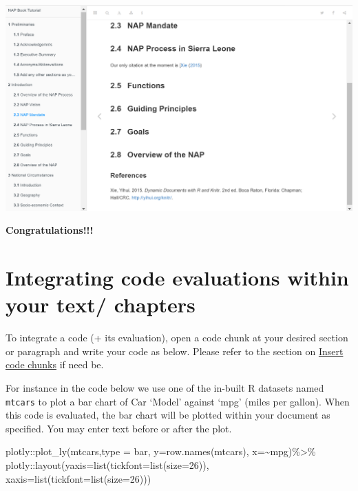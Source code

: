\documentclass[
]{book}
\newenvironment{Shaded}{\begin{snugshade}}{\end{snugshade}}
\newcommand{\AttributeTok}[1]{\textcolor[rgb]{0.77,0.63,0.00}{#1}}
\newcommand{\DecValTok}[1]{\textcolor[rgb]{0.00,0.00,0.81}{#1}}
\newcommand{\FunctionTok}[1]{\textcolor[rgb]{0.00,0.00,0.00}{#1}}
\newcommand{\NormalTok}[1]{#1}
\newcommand{\SpecialCharTok}[1]{\textcolor[rgb]{0.00,0.00,0.00}{#1}}
\newcommand{\StringTok}[1]{\textcolor[rgb]{0.31,0.60,0.02}{#1}}
\let\origfigure\figure
\let\endorigfigure\endfigure
\renewenvironment{figure}[1][2] {
    \expandafter\origfigure\expandafter[H]
} {
    \endorigfigure
}
\begin{document}
\begin{figure}
\centering
\includegraphics{tutorial_screenshots/reference_incl.png}
\caption{citation added to ref}
\end{figure}

\textbf{Congratulations!!!}

\hypertarget{integrating-code-evaluations-within-your-text-chapters}{%
\section{Integrating code evaluations within your text/ chapters}\label{integrating-code-evaluations-within-your-text-chapters}}

To integrate a code (+ its evaluation), open a code chunk at your desired section or paragraph and write your code as below. Please refer to the section on \protect\hyperlink{insert-code-chunks}{Insert code chunks} if need be.

For instance in the code below we use one of the in-built R datasets named \texttt{mtcars} to plot a bar chart of Car `Model' against `mpg' (miles per gallon).
When this code is evaluated, the bar chart will be plotted within your document as specified. You may enter text before or after the plot.

\begin{Shaded}
\begin{Highlighting}[]
\NormalTok{plotly}\SpecialCharTok{::}\FunctionTok{plot\_ly}\NormalTok{(mtcars,}\AttributeTok{type =} \StringTok{\textquotesingle{}bar\textquotesingle{}}\NormalTok{, }
                \AttributeTok{y=}\FunctionTok{row.names}\NormalTok{(mtcars), }\AttributeTok{x=}\SpecialCharTok{\textasciitilde{}}\NormalTok{mpg)}\SpecialCharTok{\%\textgreater{}\%}
\NormalTok{  plotly}\SpecialCharTok{::}\FunctionTok{layout}\NormalTok{(}\AttributeTok{yaxis=}\FunctionTok{list}\NormalTok{(}\AttributeTok{tickfont=}\FunctionTok{list}\NormalTok{(}\AttributeTok{size=}\DecValTok{26}\NormalTok{)),}
                 \AttributeTok{xaxis=}\FunctionTok{list}\NormalTok{(}\AttributeTok{tickfont=}\FunctionTok{list}\NormalTok{(}\AttributeTok{size=}\DecValTok{26}\NormalTok{)))}
\end{Highlighting}
\end{Shaded}
\end{document}
